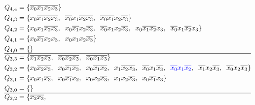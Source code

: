 \documentclass[a4paper]{article}
\begin{document}
\begin{enumerate}[label=\alph*)]
\begin{enumerate}[label=\roman*)]
		\begin{align*}
			Q_{4,4} &= \{\overline{x_0 x_1 x_2 x_3}\}\\
			Q_{4,3} &= \{x_0\overline{x_1x_2x_3},\hspace{0.2cm}
			\overline{x_0}x_1\overline{x_2 x_3},\hspace{0.2cm}
			\overline{x_0 x_1}x_2\overline{x_3}\}\\
			Q_{4,2} &= \{x_0x_1\overline{x_2 x_3},\hspace{0.2cm}
			x_0 \overline{x_1} x_2 \overline{x_3},\hspace{0.2cm}
			\overline{x_0} x_1 x_2 \overline{x_3} ,\hspace{0.2cm}
			x_0 \overline{x_1 x_2} x_3,\hspace{0.2cm}
			\overline{x_0} x_1 \overline{x_2} x_3
			\}\\
			Q_{4,1} &= \{x_0 \overline{x_1} x_2 x_3,\hspace{0.2cm}
			x_0 x_1 x_2 \overline{x_3} 
			\}\\
			Q_{4,0} &= \{\}\\
			\hline	
			Q_{3,3} &= \{\overline{x_1x_2x_3},\hspace{0.2cm}
			\overline{x_0x_2x_3},\hspace{0.2cm}
			\overline{x_0x_1x_3}\}\\
			Q_{3,2} &= \{
			x_0\overline{x_2x_3},\hspace{0.2cm}
			x_0\overline{x_1x_3},\hspace{0.2cm}
			x_0\overline{x_1 x_2},\hspace{0.2cm}
			x_1\overline{x_2 x_3},\hspace{0.2cm}
			\overline{x_0}x_1\overline{x_3},\hspace{0.2cm}
			\textcolor{blue}{\overline{x_0}x_1\overline{x_2}},\hspace{0.2cm}
			\overline{x_1}x_2\overline{x_3},\hspace{0.2cm}
			\overline{x_0}x_2\overline{x_3}
			\}\\
			Q_{3,1} &= \{
			x_0x_1\overline{x_3},\hspace{0.2cm}
			x_0\overline{x_1}x_2,\hspace{0.2cm}
			x_0x_2\overline{x_3},\hspace{0.2cm}
			x_1x_2\overline{x_3},\hspace{0.2cm}
			x_0\overline{x_1}x_3
			\}\\
			Q_{3,0} &= \{ \}\\
			\hline
			Q_{2,2} &= \{ 
			\overline{x_2x_3},\hspace{0.2cm}

\end{align*}
\end{enumerate}
\end{enumerate}
\end{document}
